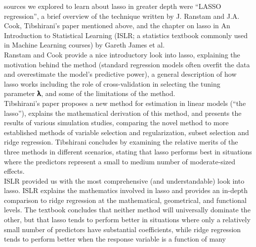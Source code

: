 \documentclass[
]{article}
\begin{document}
sources we explored to learn about lasso in greater depth were ``LASSO
regression'', a brief overview of the technique written by J. Ranstam
and J.A. Cook, Tibshirani's paper mentioned above, and the chapter on
lasso in An Introduction to Statistical Learning (ISLR; a statistics
textbook commonly used in Machine Learning courses) by Gareth James et
al.~\\
\hspace*{0.333em}\hspace*{0.333em}\hspace*{0.333em}\hspace*{0.333em}Ranstam
and Cook provide a nice introductory look into lasso, explaining the
motivation behind the method (standard regression models often overfit
the data and overestimate the model's predictive power), a general
description of how lasso works including the role of cross-validation in
selecting the tuning parameter 𝛌, and some of the limitations of the
method.\\
\hspace*{0.333em}\hspace*{0.333em}\hspace*{0.333em}\hspace*{0.333em}Tibshirani's
paper proposes a new method for estimation in linear models (``the
lasso''), explains the mathematical derivation of this method, and
presents the results of various simulation studies, comparing the novel
method to more established methods of variable selection and
regularization, subset selection and ridge regression. Tibshirani
concludes by examining the relative merits of the three methods in
different scenarios, stating that lasso performs best in situations
where the predictors represent a small to medium number of
moderate-sized effects.\\
\hspace*{0.333em}\hspace*{0.333em}\hspace*{0.333em}\hspace*{0.333em}ISLR
provided us with the most comprehensive (and understandable) look into
lasso. ISLR explains the mathematics involved in lasso and provides an
in-depth comparison to ridge regression at the mathematical,
geometrical, and functional levels. The textbook concludes that neither
method will universally dominate the other, but that lasso tends to
perform better in situations where only a relatively small number of
predictors have substantial coefficients, while ridge regression tends
to perform better when the response variable is a function of many
\end{document}
